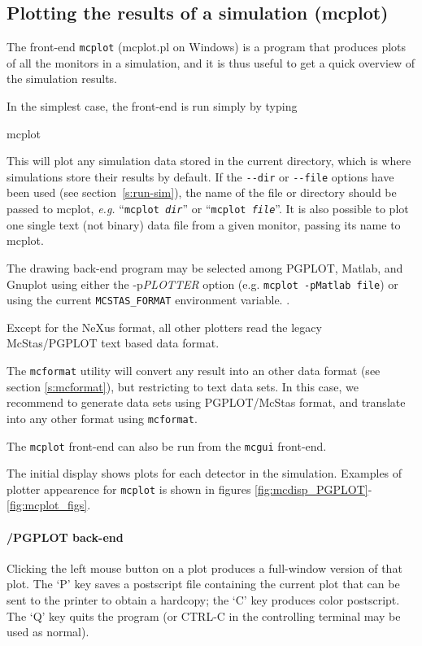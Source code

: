 \subsection{Plotting the results of a simulation (mcplot)}
\label{s:mcplot}

The front-end \verb+mcplot+ (mcplot.pl on Windows) is a program that produces
plots of all the monitors in a simulation, and it is thus useful to get
a quick overview of the simulation results.

In the simplest case, the front-end is run simply by typing
\begin{bash}
    mcplot
\end{bash}
This will plot any simulation data stored in the current directory, which is
where simulations store their results by default. If the \verb+--dir+ or
\verb+--file+ options have been used (see section~\ref{s:run-sim}), the name of
the file or directory should be passed to mcplot, {\em e.g.} ``\texttt{mcplot
  {\it dir}}'' or ``\texttt{mcplot {\it file}}''.  It is also possible to plot
one single text (not binary) data file from a given monitor, passing its name to
mcplot.

The drawing back-end program may be selected among PGPLOT, Matlab, and
Gnuplot using either the -p{\it PLOTTER} option (e.g. \texttt{mcplot -pMatlab
file}) or using the current \verb+MCSTAS_FORMAT+ environment
variable. .

Except for the NeXus format, all other plotters read the legacy 
McStas/PGPLOT text based data format. 

The \verb+mcformat+ utility will convert any \MCS
result into an other data format (see section \ref{s:mcformat}), but restricting to text
data sets. In this case, we recommend to generate data sets using PGPLOT/McStas
format, and translate into any other format using \verb+mcformat+.

The \verb+mcplot+ front-end can also be run from the \verb+mcgui+ front-end.

The initial display shows plots for each detector in the simulation.
Examples of plotter appearence for \verb+mcplot+ is shown in figures
 \ref{fig:mcdisp_PGPLOT}-\ref{fig:mcplot_figs}.

\paragraph{\MCS /PGPLOT back-end}
Clicking the left mouse button on a plot produces a full-window version
of that plot. The `P' key saves a postscript file containing the current
plot that can be sent to the printer to obtain a hardcopy; the `C' key
produces color postscript.
The `Q' key quits the program (or CTRL-C in the controlling
terminal may be used as normal).

